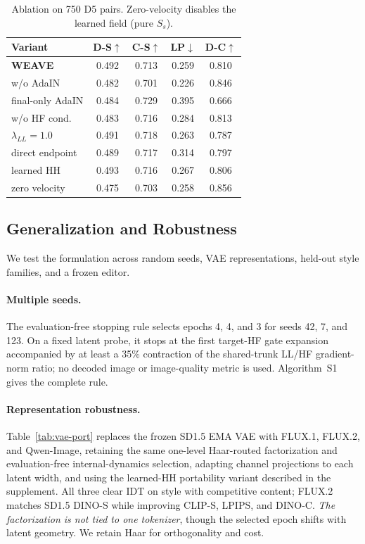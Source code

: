 \documentclass[letterpaper]{article} %
\begin{document}
\begin{table}[ht]
\centering
\begin{tabular}{@{}lcccc@{}}
\toprule
Variant & D-S$\uparrow$ & C-S$\uparrow$ & LP$\downarrow$ & D-C$\uparrow$ \\
\midrule
\textbf{WEAVE} & 0.492 & 0.713 & 0.259 & 0.810 \\
w/o AdaIN & 0.482 & 0.701 & 0.226 & 0.846 \\
final-only AdaIN & 0.484 & 0.729 & 0.395 & 0.666 \\
w/o HF cond. & 0.483 & 0.716 & 0.284 & 0.813 \\
$\lambda_{LL}{=}1.0$ & 0.491 & 0.718 & 0.263 & 0.787 \\
direct endpoint & 0.489 & 0.717 & 0.314 & 0.797 \\
learned HH & 0.493 & 0.716 & 0.267 & 0.806 \\
zero velocity & 0.475 & 0.703 & 0.258 & 0.856 \\
\bottomrule
\end{tabular}
\caption{Ablation on 750 D5 pairs. Zero-velocity disables the learned field (pure $S_s$).}
\label{tab:ablation}
\end{table}

\subsection{Generalization and Robustness}
\label{sec:generalization}

We test the formulation across random seeds, VAE representations, held-out style families,
and a frozen editor.

\paragraph{Multiple seeds.}
The evaluation-free stopping rule selects epochs 4, 4, and 3 for seeds
42, 7, and 123. On a fixed latent probe, it stops at the first target-HF
gate expansion accompanied by at least a 35\% contraction of the
shared-trunk LL/HF gradient-norm ratio; no decoded image or
image-quality metric is used. Algorithm~S1 gives the complete rule.

\paragraph{Representation robustness.}
Table~\ref{tab:vae-port} replaces the frozen SD1.5 EMA VAE with FLUX.1, FLUX.2, and
Qwen-Image, retaining the same one-level Haar-routed factorization and evaluation-free
internal-dynamics selection, adapting channel projections to each latent width, and using
the learned-HH portability variant described in the supplement. All three clear IDT on style
with competitive content; FLUX.2 matches SD1.5 DINO-S while improving CLIP-S, LPIPS, and
DINO-C. \emph{The factorization is not tied to one tokenizer}, though the selected epoch
shifts with latent geometry. We retain Haar for orthogonality and cost.
\end{document}
